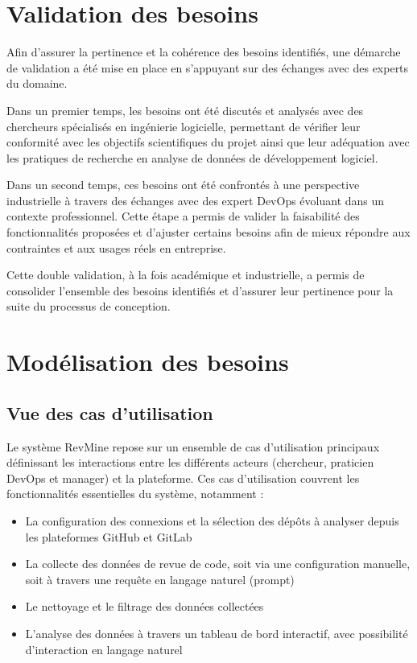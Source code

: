 \newpage
\section{Validation des besoins}
Afin d’assurer la pertinence et la cohérence des besoins identifiés, une démarche de validation a été mise en place en s’appuyant sur des échanges avec des experts du domaine.

Dans un premier temps, les besoins ont été discutés et analysés avec des chercheurs spécialisés en ingénierie logicielle, permettant de vérifier leur conformité avec les objectifs scientifiques du projet ainsi que leur adéquation avec les pratiques de recherche en analyse de données de développement logiciel.

Dans un second temps, ces besoins ont été confrontés à une perspective industrielle à travers des échanges avec des expert DevOps évoluant dans un contexte professionnel. Cette étape a permis de valider la faisabilité des fonctionnalités proposées et d’ajuster certains besoins afin de mieux répondre aux contraintes et aux usages réels en entreprise.

Cette double validation, à la fois académique et industrielle, a permis de consolider l’ensemble des besoins identifiés et d’assurer leur pertinence pour la suite du processus de conception.

\vspace{1em}
\vspace{1em}

\section{Modélisation des besoins}
\subsection{Vue des cas d’utilisation}
Le système RevMine repose sur un ensemble de cas d’utilisation principaux définissant les interactions entre les différents acteurs (chercheur, praticien DevOps et manager) et la plateforme. Ces cas d’utilisation couvrent les fonctionnalités essentielles du système, notamment :

  \begin{itemize}
    \item La configuration des connexions et la sélection des dépôts à analyser depuis les plateformes GitHub et GitLab
    \item La collecte des données de revue de code, soit via une configuration manuelle, soit à travers une requête en langage naturel (prompt)
    \item Le nettoyage et le filtrage des données collectées
    \item L’analyse des données à travers un tableau de bord interactif, avec possibilité d’interaction en langage naturel
  \end{itemize}


